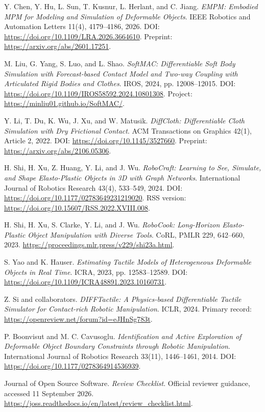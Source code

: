 \documentclass[11pt]{article}
\begin{document}
\begin{enumerate}[leftmargin=1.6em,label={[\arabic*]}]
\item Y. Chen, Y. Hu, L. Sun, T. Kusnur, L. Herlant, and C. Jiang. \emph{EMPM: Embodied MPM for Modeling and Simulation of Deformable Objects}. IEEE Robotics and Automation Letters 11(4), 4179--4186, 2026. DOI: \url{https://doi.org/10.1109/LRA.2026.3664610}. Preprint: \url{https://arxiv.org/abs/2601.17251}.
\item M. Liu, G. Yang, S. Luo, and L. Shao. \emph{SoftMAC: Differentiable Soft Body Simulation with Forecast-based Contact Model and Two-way Coupling with Articulated Rigid Bodies and Clothes}. IROS, 2024, pp. 12008--12015. DOI: \url{https://doi.org/10.1109/IROS58592.2024.10801308}. Project: \url{https://minliu01.github.io/SoftMAC/}.
\item Y. Li, T. Du, K. Wu, J. Xu, and W. Matusik. \emph{DiffCloth: Differentiable Cloth Simulation with Dry Frictional Contact}. ACM Transactions on Graphics 42(1), Article 2, 2022. DOI: \url{https://doi.org/10.1145/3527660}. Preprint: \url{https://arxiv.org/abs/2106.05306}.
\item H. Shi, H. Xu, Z. Huang, Y. Li, and J. Wu. \emph{RoboCraft: Learning to See, Simulate, and Shape Elasto-Plastic Objects in 3D with Graph Networks}. International Journal of Robotics Research 43(4), 533--549, 2024. DOI: \url{https://doi.org/10.1177/02783649231219020}. RSS version: \url{https://doi.org/10.15607/RSS.2022.XVIII.008}.
\item H. Shi, H. Xu, S. Clarke, Y. Li, and J. Wu. \emph{RoboCook: Long-Horizon Elasto-Plastic Object Manipulation with Diverse Tools}. CoRL, PMLR 229, 642--660, 2023. \url{https://proceedings.mlr.press/v229/shi23a.html}.
\item S. Yao and K. Hauser. \emph{Estimating Tactile Models of Heterogeneous Deformable Objects in Real Time}. ICRA, 2023, pp. 12583--12589. DOI: \url{https://doi.org/10.1109/ICRA48891.2023.10160731}.
\item Z. Si and collaborators. \emph{DIFFTactile: A Physics-based Differentiable Tactile Simulator for Contact-rich Robotic Manipulation}. ICLR, 2024. Primary record: \url{https://openreview.net/forum?id=eJHnSg783t}.
\item P. Boonvisut and M. C. Cavusoglu. \emph{Identification and Active Exploration of Deformable Object Boundary Constraints through Robotic Manipulation}. International Journal of Robotics Research 33(11), 1446--1461, 2014. DOI: \url{https://doi.org/10.1177/0278364914536939}.
\item Journal of Open Source Software. \emph{Review Checklist}. Official reviewer guidance, accessed 11 September 2026. \url{https://joss.readthedocs.io/en/latest/review_checklist.html}.

\end{enumerate}
\end{document}
